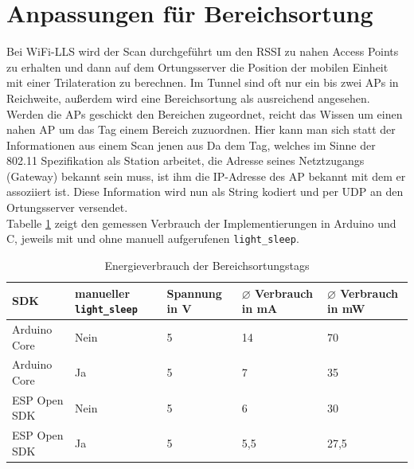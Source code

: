 \section{Anpassungen für Bereichsortung}
\label{ch:phase1:sec:anpassungbereich}
Bei WiFi-LLS wird der Scan durchgeführt um den RSSI zu nahen Access Points zu erhalten und dann auf dem Ortungsserver die Position der mobilen Einheit mit einer Trilateration zu berechnen.
Im Tunnel sind oft nur ein bis zwei APs in Reichweite, außerdem wird eine Bereichsortung als ausreichend angesehen. \\
Werden die APs geschickt den Bereichen zugeordnet, reicht das Wissen um einen nahen AP um das Tag einem Bereich zuzuordnen.
Hier kann man sich statt der Informationen aus einem Scan jenen aus 
Da dem Tag, welches im Sinne der 802.11 Spezifikation als Station arbeitet, die Adresse seines Netztzugangs (Gateway) bekannt sein muss, ist ihm die IP-Adresse des AP bekannt mit dem er assoziiert ist.
Diese Information wird nun als String kodiert und per UDP an den Ortungsserver versendet.\\
Tabelle \ref{table:naiveconsumption} zeigt den gemessen Verbrauch der Implementierungen in Arduino und C, jeweils mit und ohne manuell aufgerufenen \texttt{light\_sleep}.

\begin{table}[h]
	\centering
	\caption{Energieverbrauch der Bereichsortungstags}
	\label{table:naiveconsumption}
	\begin{tabular}{p{3cm}|p{2.2cm}|p{1.7cm}|p{2.5cm}|p{2.5cm}}
		SDK & manueller \texttt{light\_sleep} & Spannung in V & $\varnothing$ Verbrauch in mA & $\varnothing$ Verbrauch in mW \\
		\hline
		Arduino Core & Nein & 5 & 14 & 70 \\
		Arduino Core & Ja & 5 & 7 & 35 \\
		ESP Open SDK & Nein & 5 & 6 & 30 \\
		ESP Open SDK & Ja & 5 & 5,5 & 27,5 \\
	\end{tabular}
\end{table}

